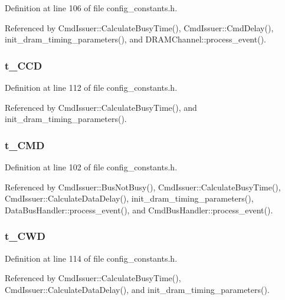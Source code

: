 Definition at line 106 of file config\_\-constants.h.

Referenced by CmdIssuer::CalculateBusyTime(), CmdIssuer::CmdDelay(), init\_\-dram\_\-timing\_\-parameters(), and DRAMChannel::process\_\-event().
\subsubsection[{t\_\-CCD}]{ {\bf t\_\-CCD}}\label{config__constants_8h_678432cf3d4dac2a1d3880f336cc8044}




Definition at line 112 of file config\_\-constants.h.

Referenced by CmdIssuer::CalculateBusyTime(), and init\_\-dram\_\-timing\_\-parameters().
\subsubsection[{t\_\-CMD}]{ {\bf t\_\-CMD}}\label{config__constants_8h_efe4d57151bd8153618cfa15165705ef}




Definition at line 102 of file config\_\-constants.h.

Referenced by CmdIssuer::BusNotBusy(), CmdIssuer::CalculateBusyTime(), CmdIssuer::CalculateDataDelay(), init\_\-dram\_\-timing\_\-parameters(), DataBusHandler::process\_\-event(), and CmdBusHandler::process\_\-event().
\subsubsection[{t\_\-CWD}]{ {\bf t\_\-CWD}}\label{config__constants_8h_8e5df97e5c05a4940306cb3f09749cfc}




Definition at line 114 of file config\_\-constants.h.

Referenced by CmdIssuer::CalculateBusyTime(), CmdIssuer::CalculateDataDelay(), and init\_\-dram\_\-timing\_\-parameters().
